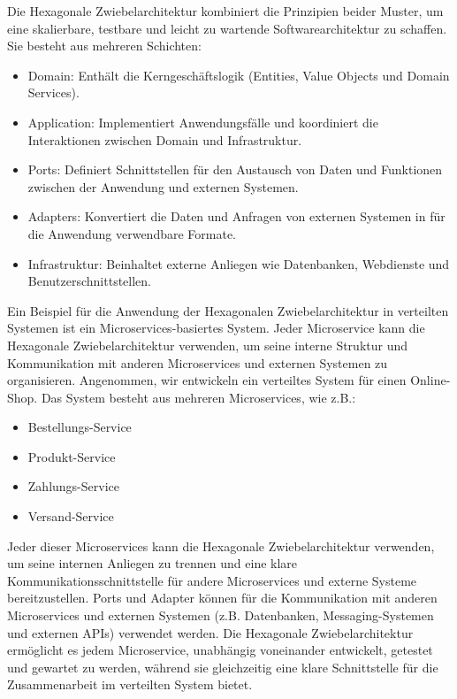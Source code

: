 \documentclass[../vs-script-first-v01.tex]{subfiles}
\begin{document}
Die Hexagonale Zwiebelarchitektur kombiniert die Prinzipien beider Muster, um eine skalierbare, testbare und leicht zu wartende Softwarearchitektur zu schaffen. Sie besteht aus mehreren Schichten:
\begin{itemize}
\item Domain: Enthält die Kerngeschäftslogik (Entities, Value Objects und Domain Services).
\item Application: Implementiert Anwendungsfälle und koordiniert die Interaktionen zwischen Domain und Infrastruktur.
\item Ports: Definiert Schnittstellen für den Austausch von Daten und Funktionen zwischen der Anwendung und externen Systemen.
\item Adapters: Konvertiert die Daten und Anfragen von externen Systemen in für die Anwendung verwendbare Formate.
\item Infrastruktur: Beinhaltet externe Anliegen wie Datenbanken, Webdienste und Benutzerschnittstellen.
\end{itemize}
Ein Beispiel für die Anwendung der Hexagonalen Zwiebelarchitektur in verteilten Systemen ist ein Microservices-basiertes System. Jeder Microservice kann die Hexagonale Zwiebelarchitektur verwenden, um seine interne Struktur und Kommunikation mit anderen Microservices und externen Systemen zu organisieren. Angenommen, wir entwickeln ein verteiltes System für einen Online-Shop. Das System besteht aus mehreren Microservices, wie z.B.:
\begin{itemize}
\item Bestellungs-Service
\item Produkt-Service
\item Zahlungs-Service
\item Versand-Service
\end{itemize}
Jeder dieser Microservices kann die Hexagonale Zwiebelarchitektur verwenden, um seine internen Anliegen zu trennen und eine klare Kommunikationsschnittstelle für andere Microservices und externe Systeme bereitzustellen. Ports und Adapter können für die Kommunikation mit anderen Microservices und externen Systemen (z.B. Datenbanken, Messaging-Systemen und externen APIs) verwendet werden. Die Hexagonale Zwiebelarchitektur ermöglicht es jedem Microservice, unabhängig voneinander entwickelt, getestet und gewartet zu werden, während sie gleichzeitig eine klare Schnittstelle für die Zusammenarbeit im verteilten System bietet.
\end{document}
